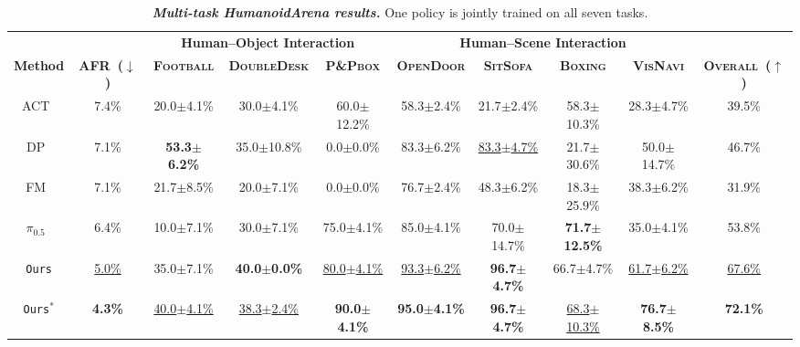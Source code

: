 \begin{table}[H]
  \setlength{\belowcaptionskip}{6pt}
  \caption{\textbf{\textit{Multi-task HumanoidArena results.}} One policy is jointly trained on all seven tasks.}
  \label{tab:arena_multi_task}
  \centering
  \begin{adjustbox}{max width=\textwidth}
  \setlength{\tabcolsep}{4.2pt}
  \renewcommand{\arraystretch}{1.08}

  \begin{tabular}{ccccc|ccccc}
  \toprule
  & &
  \multicolumn{3}{c|}{\textbf{Human--Object Interaction}} &
  \multicolumn{4}{c}{\textbf{Human--Scene Interaction}} & \\
  \cmidrule(lr){3-5}
  \cmidrule(lr){6-9}

  \multirow{-2}{*}{\textbf{Method}} &
  \multirow{-2}{*}{\textbf{AFR~($\downarrow$)}} &
  \textbf{\textsc{Football}} &
  \textbf{\textsc{DoubleDesk}} &
  \textbf{\textsc{P\&Pbox}} &
  \textbf{\textsc{OpenDoor}} &
  \textbf{\textsc{SitSofa}} &
  \textbf{\textsc{Boxing}} &
  \textbf{\textsc{VisNavi}} &
  \multirow{-2}{*}{\textbf{\textsc{Overall~($\uparrow$)}}} \\
  \midrule

  ACT~\cite{ACT}
  & 7.4\%
  & 20.0$\pm$4.1\%
  & 30.0$\pm$4.1\%
  & 60.0$\pm$12.2\%
  & 58.3$\pm$2.4\%
  & 21.7$\pm$2.4\%
  & 58.3$\pm$10.3\%
  & 28.3$\pm$4.7\%
  & 39.5\% \\

  DP~\cite{chi2023diffusionpolicy}
  & 7.1\%
  & \textbf{53.3$\pm$6.2\%}
  & 35.0$\pm$10.8\%
  & 0.0$\pm$0.0\%
  & 83.3$\pm$6.2\%
  & \underline{83.3$\pm$4.7\%}
  & 21.7$\pm$30.6\%
  & 50.0$\pm$14.7\%
  & 46.7\% \\

  FM~\cite{FM_objective}
  & 7.1\%
  & 21.7$\pm$8.5\%
  & 20.0$\pm$7.1\%
  & 0.0$\pm$0.0\%
  & 76.7$\pm$2.4\%
  & 48.3$\pm$6.2\%
  & 18.3$\pm$25.9\%
  & 38.3$\pm$6.2\%
  & 31.9\% \\

  $\pi_{0.5}$~\cite{pi05}
  & 6.4\%
  & 10.0$\pm$7.1\%
  & 30.0$\pm$7.1\%
  & 75.0$\pm$4.1\%
  & 85.0$\pm$4.1\%
  & 70.0$\pm$14.7\%
  & \textbf{71.7$\pm$12.5\%}
  & 35.0$\pm$4.1\%
  & 53.8\% \\

  \rowcolor{hclbrown!8!white}
  \texttt{Ours}
  & \underline{5.0\%}
  & 35.0$\pm$7.1\%
  & \textbf{40.0$\pm$0.0\%}
  & \underline{80.0$\pm$4.1\%}
  & \underline{93.3$\pm$6.2\%}
  & \textbf{96.7$\pm$4.7\%}
  & 66.7$\pm$4.7\%
  & \underline{61.7$\pm$6.2\%}
  & \underline{67.6\%} \\


  \rowcolor{hclbrown!15!white}
  \texttt{Ours}$^{*}$
  & \textbf{4.3\%}
  & \underline{40.0$\pm$4.1\%}
  & \underline{38.3$\pm$2.4\%}
  & \textbf{90.0$\pm$4.1\%}
  & \textbf{95.0$\pm$4.1\%}
  & \textbf{96.7$\pm$4.7\%}
  & \underline{68.3$\pm$10.3\%}
  & \textbf{76.7$\pm$8.5\%}
  & \textbf{72.1\%} \\



  \bottomrule
  \end{tabular}
  \end{adjustbox}
\end{table}
